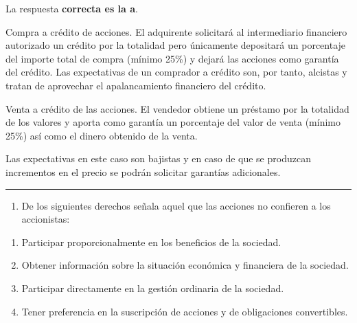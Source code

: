 \documentclass[
  letterpaper,
  DIV=11,
  numbers=noendperiod]{scrreprt}
\providecommand{\tightlist}{%
  \setlength{\itemsep}{0pt}\setlength{\parskip}{0pt}}\usepackage{longtable,booktabs,array}
\begin{document}
\begin{tcolorbox}[enhanced jigsaw, left=2mm, opacityback=0, colback=white, breakable, arc=.35mm, bottomrule=.15mm, rightrule=.15mm, toprule=.15mm, leftrule=.75mm, colframe=quarto-callout-tip-color-frame]
\begin{minipage}[t]{5.5mm}
\textcolor{quarto-callout-tip-color}{\faLightbulb}
\end{minipage}%
\begin{minipage}[t]{\textwidth - 5.5mm}

La respuesta \textbf{correcta es la a}.

Compra a crédito de acciones. El adquirente solicitará al intermediario
financiero autorizado un crédito por la totalidad pero únicamente
depositará un porcentaje del importe total de compra (mínimo 25\%) y
dejará las acciones como garantía del crédito. Las expectativas de un
comprador a crédito son, por tanto, alcistas y tratan de aprovechar el
apalancamiento financiero del crédito.

Venta a crédito de las acciones. El vendedor obtiene un préstamo por la
totalidad de los valores y aporta como garantía un porcentaje del valor
de venta (mínimo 25\%) así como el dinero obtenido de la venta.

Las expectativas en este caso son bajistas y en caso de que se produzcan
incrementos en el precio se podrán solicitar garantías adicionales.

\end{minipage}%
\end{tcolorbox}

\begin{center}\rule{0.5\linewidth}{0.5pt}\end{center}

\begin{enumerate}
\def\labelenumi{\arabic{enumi}.}
\setcounter{enumi}{83}
\tightlist
\item
  De los siguientes derechos señala aquel que las acciones no confieren
  a los accionistas:
\end{enumerate}

\begin{enumerate}
\def\labelenumi{\alph{enumi}.}
\item
  Participar proporcionalmente en los beneficios de la sociedad.
\item
  Obtener información sobre la situación económica y financiera de la
  sociedad.
\item
  Participar directamente en la gestión ordinaria de la sociedad.
\item
  Tener preferencia en la suscripción de acciones y de obligaciones
  convertibles.
\end{enumerate}
\end{document}
